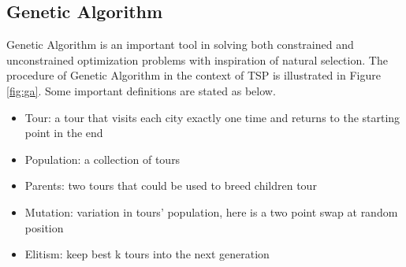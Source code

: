 \documentclass[twocolumn]{article}
\begin{document}
\subsection{Genetic Algorithm}
Genetic Algorithm is an important tool in solving both constrained and unconstrained optimization problems with inspiration of natural selection. The procedure of  Genetic Algorithm in the context of TSP is illustrated in Figure \ref{fig:ga}. Some important definitions are stated as below.
\begin{itemize}
\setlength\itemsep{0pt}
\setlength\parskip{0pt}
\item Tour: a tour that visits each city exactly one time and returns to the starting point in the end
\item Population: a collection of tours
\item Parents: two tours that could be used to breed children tour
\item Mutation: variation in tours' population, here is a two point swap at random position 
\item Elitism: keep best k tours into the next generation
\end{itemize}
\end{document}
